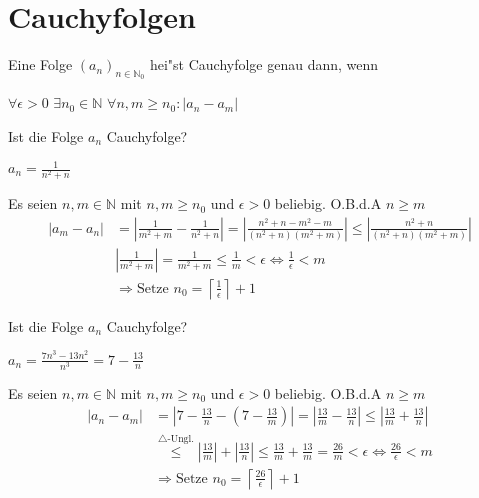 \documentclass[a4paper,12pt]{article}
\begin{document}
	\section{Cauchyfolgen}
	\begin{defi}
		Eine Folge $\left(a_n\right)_{n \in \mathbb{N}_0}$ hei"st Cauchyfolge genau dann, wenn
		\begin{center}
			$\forall \epsilon > 0$ $\exists n_0 \in \mathbb{N}$ $\forall n,m \geq n_0 : \left|a_n - a_m \right|$
		\end{center}
	\end{defi}
	\begin{bsp}
		Ist die Folge $a_n$ Cauchyfolge?
		\begin{center}
			$a_n = \frac{1}{n^2+n}$
		\end{center}
	\end{bsp}
	Es seien $n,m \in \mathbb{N}$ mit $n, m \geq n_0$ und $\epsilon > 0$ beliebig. O.B.d.A $n \geq m$\\
	\begin{align*}
		\left|a_m - a_n\right| &= \left|\frac{1}{m^2+m} - \frac{1}{n^2+n}\right| = \left|\frac{n^2+n-m^2-m}{\left(n^2+n\right) \left(m^2+m\right)}\right| \leq \left|\frac{n^2+n}{\left(n^2+n\right) \left(m^2+m\right)}\right|\\
		&\left|\frac{1}{m^2+m}\right| = \frac{1}{m^2+m} \leq \frac{1}{m} < \epsilon \Leftrightarrow \frac{1}{\epsilon} < m\\
		&\Rightarrow \text{Setze } n_0 = \left\lceil\frac{1}{\epsilon}\right\rceil + 1
	\end{align*}
	\begin{bsp}
		Ist die Folge $a_n$ Cauchyfolge?
		\begin{center}
			$a_n = \frac{7n^3-13n^2}{n^3} = 7 - \frac{13}{n}$
		\end{center}
	\end{bsp}
	Es seien $n,m \in \mathbb{N}$ mit $n, m \geq n_0$ und $\epsilon > 0$ beliebig. O.B.d.A $n \geq m$\\
	\begin{align*}
		\left|a_n - a_m\right| &= \left|7-\frac{13}{n}-\left(7-\frac{13}{m}\right)\right| = \left|\frac{13}{m} - \frac{13}{n}\right| \leq \left|\frac{13}{m} + \frac{13}{n}\right|\\
		&\overset{\triangle\text{-Ungl.}}{\leq} \left|\frac{13}{m}\right| + \left|\frac{13}{n}\right| \leq \frac{13}{m} + \frac{13}{m} = \frac{26}{m} < \epsilon \Leftrightarrow \frac{26}{\epsilon} < m\\
		&\Rightarrow \text{Setze } n_0 = \left\lceil\frac{26}{\epsilon}\right\rceil + 1
	\end{align*}
\end{document}
